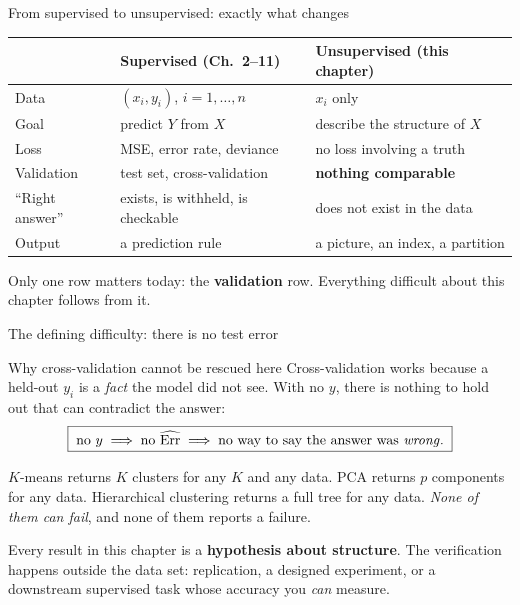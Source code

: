 \documentclass[aspectratio=169,11pt]{beamer}
\begin{document}
\begin{frame}{From supervised to unsupervised: exactly what changes}
  \begin{center}\footnotesize
  \begin{tabular}{@{}lll@{}}
    \toprule
     & \textbf{Supervised (Ch.\ 2--11)} & \textbf{Unsupervised (this chapter)} \\
    \midrule
    Data                & $(x_i, y_i)$, $i=1,\dots,n$ & $x_i$ only \\
    Goal                & predict $Y$ from $X$ & describe the structure of $X$ \\
    Loss                & MSE, error rate, deviance & no loss involving a truth \\
    Validation          & test set, cross-validation & \textbf{nothing comparable} \\
    ``Right answer''    & exists, is withheld, is checkable & does not exist in the data \\
    Output              & a prediction rule & a picture, an index, a partition \\
    \bottomrule
  \end{tabular}
  \end{center}
  \begin{takeaway}
    Only one row matters today: the \textbf{validation} row. Everything difficult about this
    chapter follows from it.
  \end{takeaway}
\end{frame}

\begin{frame}{The defining difficulty: there is no test error}
  \footnotesize
  \begin{block}{Why cross-validation cannot be rescued here}
    Cross-validation works because a held-out $y_i$ is a \emph{fact} the model did not see.
    With no $y$, there is nothing to hold out that can contradict the answer:
    \[
      \boxed{\;\text{no } y \;\Longrightarrow\; \text{no } \widehat{\mathrm{Err}}
      \;\Longrightarrow\; \text{no way to say the answer was \emph{wrong}}.\;}
    \]
  \end{block}
  \begin{readme}
    $K$-means returns $K$ clusters for any $K$ and any data. PCA returns $p$ components
    for any data. Hierarchical clustering returns a full tree for any data. \emph{None of
    them can fail}, and none of them reports a failure.
  \end{readme}
  \begin{takeaway}
    Every result in this chapter is a \textbf{hypothesis about structure}. The verification
    happens outside the data set: replication, a designed experiment, or a downstream
    supervised task whose accuracy you \emph{can} measure.
  \end{takeaway}
\end{frame}
\end{document}
